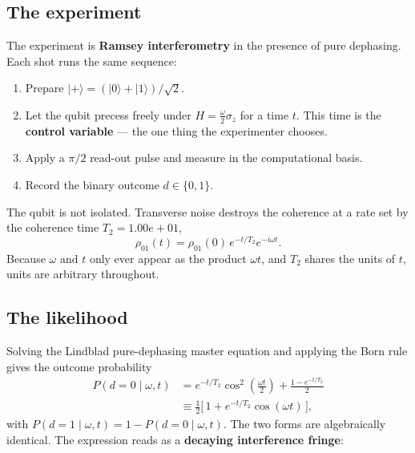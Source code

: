 \documentclass[12pt,a4paper]{article}
\begin{document}
\subsection{The experiment}
\label{sec:the-experiment}
The experiment is \textbf{Ramsey interferometry} in the presence of pure
dephasing. Each shot runs the same sequence:

\begin{enumerate}
  \item Prepare $|+\rangle = (|0\rangle + |1\rangle)/\sqrt{2}$.
  \item Let the qubit precess freely under
        $H = \tfrac{\omega}{2}\sigma_z$ for a time $t$. This time is the
        \textbf{control variable} --- the one thing the experimenter chooses.
  \item Apply a $\pi/2$ read-out pulse and measure in the computational basis.
  \item Record the binary outcome $d \in \{0, 1\}$.
\end{enumerate}

The qubit is not isolated. Transverse noise destroys the coherence at a rate
set by the coherence time $T_2 = 1.00e+01$,
\begin{equation}
  \rho_{01}(t) = \rho_{01}(0)\,e^{-t/T_2}e^{-i\omega t}.
  \label{eq:coherence}
\end{equation}
Because $\omega$ and $t$ only ever appear as the product $\omega t$, and
$T_2$ shares the units of $t$, units are arbitrary throughout.

\subsection{The likelihood}
\label{sec:the-likelihood}
Solving the Lindblad pure-dephasing master equation and applying the Born
rule gives the outcome probability
\begin{align}
  P(d=0 \mid \omega, t)
    &= e^{-t/T_2}\cos^{2}\!\left(\frac{\omega t}{2}\right)
       + \frac{1 - e^{-t/T_2}}{2} \nonumber \\
    &\equiv \frac{1}{2}\bigl[\, 1 + e^{-t/T_2}\cos(\omega t) \,\bigr],
  \label{eq:likelihood}
\end{align}
with $P(d=1 \mid \omega, t) = 1 - P(d=0 \mid \omega, t)$. The two forms are
algebraically identical. The expression reads as a \textbf{decaying
interference fringe}:
\end{document}
